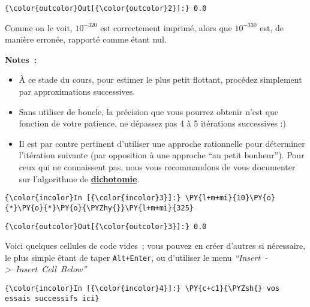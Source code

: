 \begin{Verbatim}[commandchars=\\\{\},frame=single,framerule=0.3mm,rulecolor=\color{cellframecolor}]
{\color{outcolor}Out[{\color{outcolor}2}]:} 0.0
\end{Verbatim}
            
    Comme on le voit, \(10^{-320}\) est correctement imprimé, alors que
\(10^{-330}\) est, de manière erronée, rapporté comme étant nul.

    \textbf{Notes~:}

\begin{itemize}
\item
  À ce stade du cours, pour estimer le plus petit flottant, procédez
  simplement par approximations successives.
\item
  Sans utiliser de boucle, la précision que vous pourrez obtenir n'est
  que fonction de votre patience, ne dépassez pas 4 à 5 itérations
  successives :)
\item
  Il est par contre pertinent d'utiliser une approche rationnelle pour
  déterminer l'itération suivante (par opposition à une approche ``au
  petit bonheur''). Pour ceux qui ne connaissent pas, nous vous
  recommandons de vous documenter sur l'algorithme de
  \href{https://fr.wikipedia.org/wiki/Recherche_dichotomique}{\textbf{dichotomie}}.
\end{itemize}

    \begin{Verbatim}[commandchars=\\\{\},frame=single,framerule=0.3mm,rulecolor=\color{cellframecolor}]
{\color{incolor}In [{\color{incolor}3}]:} \PY{l+m+mi}{10}\PY{o}{*}\PY{o}{*}\PY{o}{\PYZhy{}}\PY{l+m+mi}{325}
\end{Verbatim}


\begin{Verbatim}[commandchars=\\\{\},frame=single,framerule=0.3mm,rulecolor=\color{cellframecolor}]
{\color{outcolor}Out[{\color{outcolor}3}]:} 0.0
\end{Verbatim}
            
    Voici quelques cellules de code vides~; vous pouvez en créer d'autres si
nécessaire, le plus simple étant de taper \texttt{Alt+Enter}, ou
d'utiliser le menu \emph{``Insert~-\textgreater{}~Insert~Cell~Below''}

    \begin{Verbatim}[commandchars=\\\{\},frame=single,framerule=0.3mm,rulecolor=\color{cellframecolor}]
{\color{incolor}In [{\color{incolor}4}]:} \PY{c+c1}{\PYZsh{} vos essais successifs ici}
\end{Verbatim}


